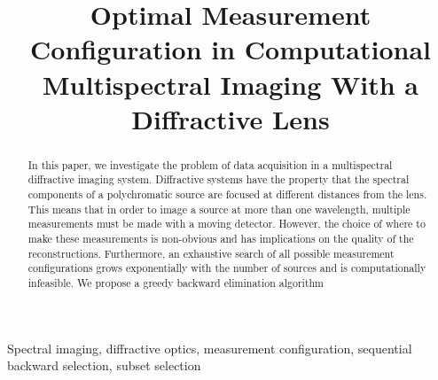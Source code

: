 \documentclass{article}
\title{Optimal Measurement Configuration in Computational \\ Multispectral Imaging With a Diffractive Lens}
\begin{document}
\maketitle

\begin{abstract}

In this paper, we investigate the problem of data acquisition in a multispectral
diffractive imaging system.  Diffractive systems have the property that the
spectral components of a polychromatic source are focused at different distances
from the lens.  This means that in order to image a source at more than one
wavelength, multiple measurements must be made with a moving detector. However,
the choice of where to make these measurements is non-obvious and has
implications on the quality of the reconstructions. Furthermore, an exhaustive
search of all possible measurement configurations grows exponentially with the
number of sources and is computationally infeasible. We propose a greedy
backward elimination algorithm
\end{abstract}

\begin{keywords}
Spectral imaging, diffractive optics, measurement configuration, sequential
backward selection, subset selection
\end{keywords}
\end{document}
